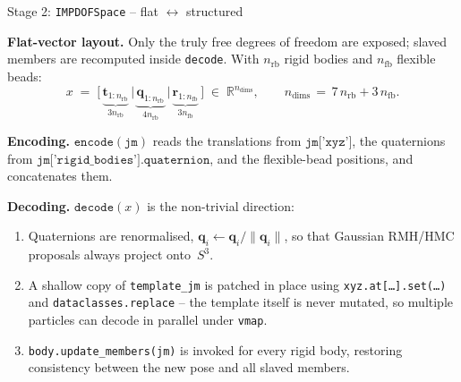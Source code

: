 \documentclass[10pt,aspectratio=169]{beamer}
\begin{document}
\begin{frame}[fragile]{Stage 2: \texttt{IMPDOFSpace} -- flat \(\leftrightarrow\) structured}

\textbf{Flat-vector layout.}
Only the truly free degrees of freedom are exposed; slaved members are
recomputed inside \texttt{decode}. With \(n_\text{rb}\) rigid bodies and
\(n_\text{fb}\) flexible beads:
\[
    x \;=\; \bigl[\,
        \underbrace{\mathbf{t}_{1:n_\text{rb}}}_{3 n_\text{rb}}\,\big|\,
        \underbrace{\mathbf{q}_{1:n_\text{rb}}}_{4 n_\text{rb}}\,\big|\,
        \underbrace{\mathbf{r}_{1:n_\text{fb}}}_{3 n_\text{fb}}
    \,\bigr]
    \;\in\;\mathbb{R}^{n_\text{dims}},
    \qquad n_\text{dims} \,=\, 7\,n_\text{rb} + 3\,n_\text{fb}.
\]

\textbf{Encoding.}
\(\texttt{encode}(\texttt{jm})\) reads the translations from
\(\texttt{jm['xyz']}\), the quaternions from
\(\texttt{jm['rigid\_bodies'].quaternion}\), and the flexible-bead
positions, and concatenates them.

\textbf{Decoding.}
\(\texttt{decode}(x)\) is the non-trivial direction:
\begin{enumerate}
    \item Quaternions are renormalised, \(\mathbf{q}_i \leftarrow \mathbf{q}_i / \|\mathbf{q}_i\|\),
          so that Gaussian RMH/HMC proposals always project onto~\(S^3\).
    \item A shallow copy of \texttt{template\_jm} is patched in place using
          \texttt{xyz.at[\dots].set(\dots)} and
          \texttt{dataclasses.replace} -- the template itself is never
          mutated, so multiple particles can decode in parallel under
          \texttt{vmap}.
    \item \texttt{body.update\_members(jm)} is invoked for every rigid
          body, restoring consistency between the new pose and all slaved
          members.
\end{enumerate}

\end{frame}
\end{document}

